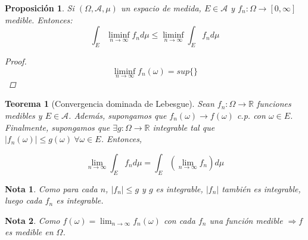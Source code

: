 \documentclass[11pt, a4paper]{article}
\newcommand{\R}{\mathbb{R}}
\theoremstyle{theorem-style}
\newtheorem{nth}{Teorema}[section]
\newtheorem{nprop}{Proposición}[section]
\theoremstyle{definition-style}
\theoremstyle{remark-style}
\newtheorem*{nota}{Nota}
\theoremstyle{example-style}
\begin{document}
\begin{nprop}
  Si $(\Omega,\mathcal{A},\mu)$ un espacio de medida, $E\in \mathcal{A}$ y $f_n:\Omega \to [0,\infty]$ medible. Entonces:
  \[
    \int_E \liminf_{n \to \infty} f_n d\mu \leq \liminf_{n\to \infty} \int_E f_n d\mu
  \]
  \begin{proof}\hfill \\
    \[
      \liminf_{n\to \infty} f_n(\omega) = sup\{\}	
    \]
    
  \end{proof}
\end{nprop}




\begin{nth}[Convergencia dominada de Lebesgue]
  Sean $f_n : \Omega \rightarrow \R$ funciones medibles y $E \in \mathcal{A}$. Además, supongamos que ${f_n(\omega)} \rightarrow f(\omega)$ c.p. con $\omega \in E$. Finalmente, supongamos que $\exists g: \Omega \rightarrow \R$ integrable tal que $|f_n(\omega)| \leq g(\omega) \ \forall \omega \in E$. Entonces,
  
  $$ \lim_{n \to \infty} \int_E f_n d \mu = \int_E  \left( \lim_{n \to \infty} f_n \right) d \mu$$ 
\end{nth}

\begin{nota}
  Como para cada $n$, $|f_n| \leq g$ y $g$ es integrable, $|f_n|$ también es integrable, luego cada $f_n$ es integrable.
\end{nota}

\begin{nota}
  Como $f(\omega) = \lim_{n \to \infty} f_n(\omega)$ con cada $f_n$ una función medible $\Rightarrow f$ es medible en $\Omega$.
\end{nota}
\end{document}
